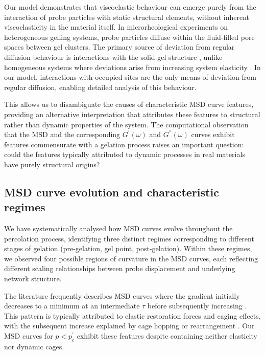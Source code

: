 \documentclass[%
 aip,
 amsmath,amssymb,
reprint, onecolumn %
]{revtex4-1}
\begin{document}
Our model demonstrates that viscoelastic behaviour can emerge purely from the interaction of probe particles with static structural elements, without inherent viscoelasticity in the material itself. In microrheological experiments on heterogeneous gelling systems, probe particles diffuse within the fluid-filled pore spaces between gel clusters. The primary source of deviation from regular diffusion behaviour is interactions with the solid gel structure \cite{Rich2011,deBruyn2013}, unlike homogeneous systems where deviations arise from increasing system elasticity \cite{Mason1995,Mason1997}. In our model, interactions with occupied sites are the only means of deviation from regular diffusion, enabling detailed analysis of this behaviour.

This allows us to disambiguate the causes of characteristic MSD curve features, providing an alternative interpretation that attributes these features to structural rather than dynamic properties of the system. The computational observation that the MSD and the corresponding $G^{'}(\omega)$ and $G^{''}(\omega)$ curves exhibit features commensurate with a gelation process raises an important question: could the features typically attributed to dynamic processes in real materials have purely structural origins?

\subsection{MSD curve evolution and characteristic regimes}

We have systematically analysed how MSD curves evolve throughout the percolation process, identifying three distinct regimes corresponding to different stages of gelation (pre-gelation, gel point, post-gelation). Within these regimes, we observed four possible regions of curvature in the MSD curves, each reflecting different scaling relationships between probe displacement and underlying network structure.

The literature frequently describes MSD curves where the gradient initially decreases to a minimum at an intermediate $\tau$ before subsequently increasing \cite{Moschakis2013,deBruyn2013,Weeks2002,Valentine2001,Yang2012}. This pattern is typically attributed to elastic restoration forces and caging effects, with the subsequent increase explained by cage hopping or rearrangement \cite{Moschakis2013,Weeks2002,Yang2012}. Our MSD curves for $p < p_{c}^{'}$ exhibit these features despite containing neither elasticity nor dynamic cages.
\end{document}
